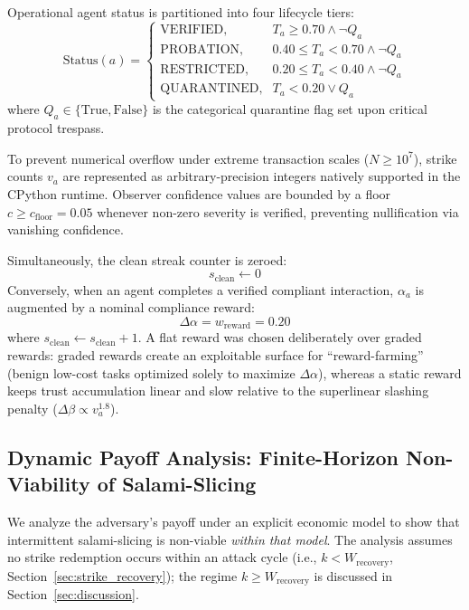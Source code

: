 \documentclass[journal]{IEEEtran}
\begin{document}
Operational agent status is partitioned into four lifecycle tiers:
\begin{equation}
\text{Status}(a) =
\begin{cases}
\text{VERIFIED}, & T_a \ge 0.70 \land \neg Q_a \\
\text{PROBATION}, & 0.40 \le T_a < 0.70 \land \neg Q_a \\
\text{RESTRICTED}, & 0.20 \le T_a < 0.40 \land \neg Q_a \\
\text{QUARANTINED}, & T_a < 0.20 \lor Q_a
\end{cases}
\label{eq:lifecycle_tiers}
\end{equation}
where $Q_a \in \{\text{True}, \text{False}\}$ is the categorical quarantine flag set upon critical protocol trespass.

To prevent numerical overflow under extreme transaction scales ($N \ge 10^7$), strike counts $v_a$ are represented as arbitrary-precision integers natively supported in the CPython runtime. Observer confidence values are bounded by a floor $c \ge c_{\text{floor}} = 0.05$ whenever non-zero severity is verified, preventing nullification via vanishing confidence.

Simultaneously, the clean streak counter is zeroed:
\begin{equation}
s_{\text{clean}} \leftarrow 0
\end{equation}
Conversely, when an agent completes a verified compliant interaction, $\alpha_a$ is augmented by a nominal compliance reward:
\begin{equation}
\Delta\alpha = w_{\text{reward}} = 0.20
\label{eq:positive_reward}
\end{equation}
where $s_{\text{clean}} \leftarrow s_{\text{clean}} + 1$. A flat reward was chosen deliberately over graded rewards: graded rewards create an exploitable surface for ``reward-farming'' (benign low-cost tasks optimized solely to maximize $\Delta\alpha$), whereas a static reward keeps trust accumulation linear and slow relative to the superlinear slashing penalty ($\Delta\beta \propto v_a^{1.8}$).

\subsection{Dynamic Payoff Analysis: Finite-Horizon Non-Viability of Salami-Slicing}

We analyze the adversary's payoff under an explicit economic model to show that intermittent salami-slicing is non-viable \emph{within that model}. The analysis assumes no strike redemption occurs within an attack cycle (i.e., $k < W_{\text{recovery}}$, Section~\ref{sec:strike_recovery}); the regime $k \ge W_{\text{recovery}}$ is discussed in Section~\ref{sec:discussion}.
\end{document}
